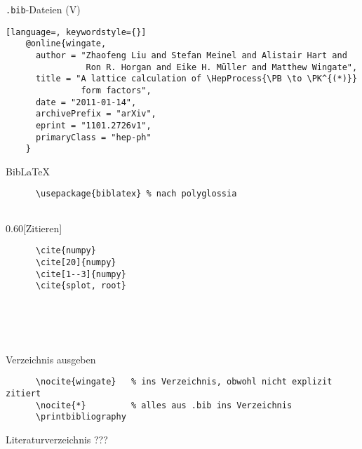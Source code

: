 \begin{frame}[fragile]{\texttt{.bib}-Dateien (V)}
  \begin{lstlisting}[language=, keywordstyle={}]
    @online{wingate,
      author = "Zhaofeng Liu and Stefan Meinel and Alistair Hart and
                Ron R. Horgan and Eike H. Müller and Matthew Wingate",
      title = "A lattice calculation of \HepProcess{\PB \to \PK^{(*)}}
               form factors",
      date = "2011-01-14",
      archivePrefix = "arXiv",
      eprint = "1101.2726v1",
      primaryClass = "hep-ph"
    }
  \end{lstlisting}
  \vspace{1em}
\end{frame}

\begin{frame}[fragile]{Bib\LaTeX\hfill{}}
  \begin{Packages}
    \begin{lstlisting}
      \usepackage{biblatex} % nach polyglossia
      
    \end{lstlisting}
  \end{Packages}
  \begin{CodeExample}{0.60}[Zitieren]
    \begin{lstlisting}
      \cite{numpy}
      \cite[20]{numpy}
      \cite[1--3]{numpy}
      \cite{splot, root}
    \end{lstlisting}
  \CodeResult
    \cite{numpy} \\
    \cite[20]{numpy} \\
    \cite[1--3]{numpy} \\
    \cite{splot, root}
  \end{CodeExample}
  \begin{block}{Verzeichnis ausgeben}
    \begin{lstlisting}
      \nocite{wingate}   % ins Verzeichnis, obwohl nicht explizit zitiert
      \nocite{*}         % alles aus .bib ins Verzeichnis
      \printbibliography
    \end{lstlisting}
  \end{block}
\end{frame}

\begin{frame}{Literaturverzeichnis}
  \centering
  \pause
  \Huge ???
\end{frame}

